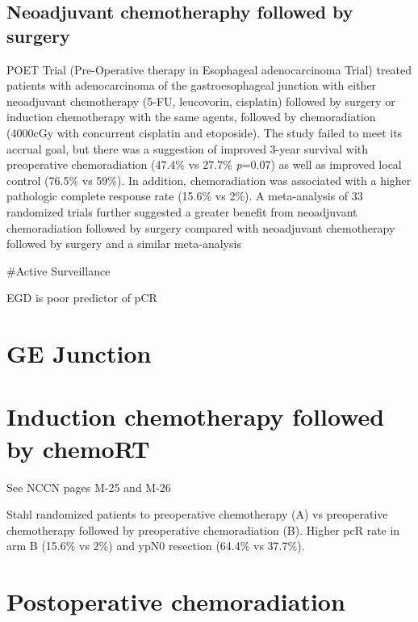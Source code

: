 \documentclass[
]{book}
\begin{document}
\hypertarget{neoadjuvant-chemotheraphy-followed-by-surgery}{%
\subsection{Neoadjuvant chemotheraphy followed by surgery}\label{neoadjuvant-chemotheraphy-followed-by-surgery}}

POET Trial (Pre-Operative therapy in Esophageal adenocarcinoma Trial) treated patients with adenocarcinoma of the gastroesophageal junction with either neoadjuvant chemotherapy (5-FU, leucovorin, cisplatin) followed by surgery or induction chemotherapy with the same agents, followed by chemoradiation (4000cGy with concurrent cisplatin and etoposide). The study failed to meet its accrual goal, but there was a suggestion of improved 3-year survival with preoperative chemoradiation (47.4\% vs 27.7\% \emph{p}=0.07) as well as improved local control (76.5\% vs 59\%). In addition, chemoradiation was associated with a higher pathologic complete response rate (15.6\% vs 2\%)\citep{stahl851}. A meta-analysis of 33 randomized trials further suggested a greater benefit from neoadjuvant chemoradiation followed by surgery compared with neoadjuvant chemotherapy followed by surgery\citep{pasquali481} and a similar meta-analysis \citep{sjoquist681}

\#Active Surveillance

EGD is poor predictor of pCR \citep{sarkaria764}

\hypertarget{ge-junction}{%
\section{GE Junction}\label{ge-junction}}

\citep{siewert260}

\hypertarget{induction-chemotherapy-followed-by-chemort}{%
\section{Induction chemotherapy followed by chemoRT}\label{induction-chemotherapy-followed-by-chemort}}

See NCCN pages M-25 and M-26

Stahl \citep{stahl851} randomized patients to preoperative chemotherapy (A) vs preoperative chemotherapy followed by preoperative chemoradiation (B). Higher pcR rate in arm B (15.6\% vs 2\%) and ypN0 resection (64.4\% vs 37.7\%).

\hypertarget{postoperative-chemoradiation}{%
\section{Postoperative chemoradiation}\label{postoperative-chemoradiation}}
\end{document}
